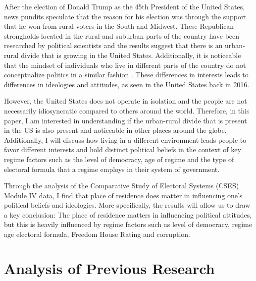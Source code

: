 \documentclass[12pt, titlepage]{article}
\begin{document}
\listoftables
\clearpage

\listoffigures
\clearpage


After the election of Donald Trump as the 45th President of the United States, news pundits speculate that the reason for his election was through the support that he won from rural voters in the South and Midwest. These Republican strongholds located in the rural and suburban parts of the country have been researched by political scientists \citep{walsh_putting_2012} and the results suggest that there is an urban-rural divide that is growing in the United States. Additionally, it is noticeable that the mindset of individuals who live in different parts of the country do not conceptualize politics in a similar fashion \citep{holloway_burning_2007}. These differences in interests leads to differences in ideologies and attitudes, as seen in the United States back in 2016.

However, the United States does not operate in isolation and the people are not necessarily idiosyncratic compared to others around the world. Therefore, in this paper, I am interested in understanding if the urban-rural divide that is present in the US is also present and noticeable in other places around the globe. Additionally, I  will discuss how living in a different environment leads people to favor different interests and hold distinct political beliefs in the context of key regime factors such as the level of democracy, age of regime and the type of electoral formula that a regime employs in their system of government.

Through the analysis of the Comparative Study of Electoral Systems (CSES) Module IV data, I find that place of residence does matter in influencing one's political beliefs and ideologies. More specifically, the results will allow us to draw a key conclusion: The place of residence matters in influencing political attitudes, but this is heavily influenced by regime factors such as level of democracy, regime age electoral formula, Freedom House Rating and corruption.

\section{Analysis of Previous Research}
\end{document}
